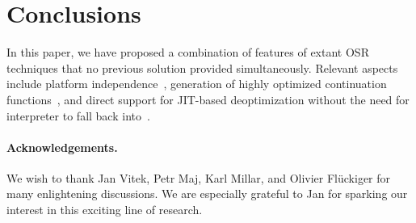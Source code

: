 
\section{Conclusions}
\label{se:conclusions}

In this paper, we have proposed a combination of features of extant OSR techniques that no previous solution provided simultaneously. Relevant aspects include platform independence~\cite{lameed2013modular}, generation of highly optimized continuation functions~\cite{fink2003design}, and direct support for JIT-based deoptimization without the need for interpreter to fall back into~\cite{bebenita2010spur}.



\ifx\noauthorea\undefined
\paragraph{Acknowledgements.}

We wish to thank Jan Vitek, Petr Maj, Karl Millar, and Olivier Fl{\"u}ckiger for many enlightening discussions. We are especially grateful to Jan for sparking our interest in this exciting line of research. %
\fi
